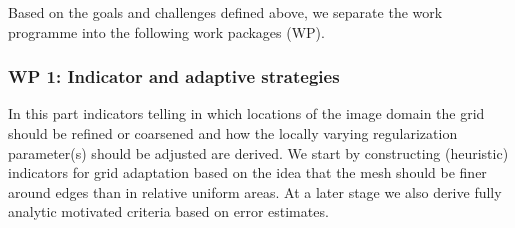 \documentclass[enabledeprecatedfontcommands,cleardoublepage=empty,headsepline,twoside,11pt,DIV=15,BCOR=12mm,final]{scrartcl}
\begin{document}
 
 Based on the goals and challenges defined above, we separate the work programme into the following work packages (WP).
 
 
\subsubsection*{WP 1: Indicator and adaptive strategies}
In this part indicators telling in which locations of the image domain the grid should be refined or coarsened and how the locally varying regularization parameter(s) should be adjusted are derived. We start by constructing (heuristic) indicators for grid adaptation based on the idea that the mesh should be finer around edges than in relative uniform areas. At a later stage we also derive fully analytic motivated criteria based on error estimates. %
 
\end{document}
